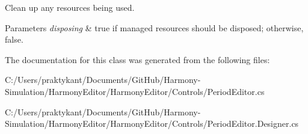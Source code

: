 Clean up any resources being used. 


\begin{DoxyParams}{Parameters}
{\em disposing} & true if managed resources should be disposed; otherwise, false.\\
\hline
\end{DoxyParams}


The documentation for this class was generated from the following files\+:\begin{DoxyCompactItemize}
\item 
C\+:/\+Users/praktykant/\+Documents/\+Git\+Hub/\+Harmony-\/\+Simulation/\+Harmony\+Editor/\+Harmony\+Editor/\+Controls/Period\+Editor.\+cs\item 
C\+:/\+Users/praktykant/\+Documents/\+Git\+Hub/\+Harmony-\/\+Simulation/\+Harmony\+Editor/\+Harmony\+Editor/\+Controls/Period\+Editor.\+Designer.\+cs\end{DoxyCompactItemize}
